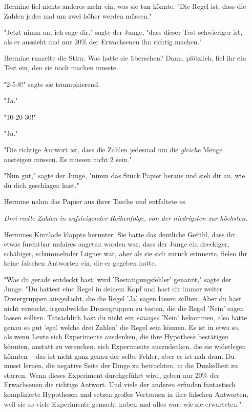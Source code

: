 {Hermine fiel nichts anderes mehr ein, was sie tun könnte. "Die Regel ist, dass die Zahlen jedes mal um zwei höher werden müssen."

"Jetzt nimm an, ich sage dir," sagte der Junge, "dass dieser Test schwieriger ist, als er aussieht und nur 20\% der Erwachsenen ihn richtig machen."

Hermine runzelte die Stirn. Was hatte sie übersehen? Dann, plötzlich, fiel ihr ein Test ein, den sie noch machen musste.

"2-5-8!" sagte sie triumphierend.

"Ja."

"10-20-30!"

"Ja."

"Die richtige Antwort ist, dass die Zahlen jedesmal um die \emph{gleiche} Menge ansteigen müssen. Es müssen nicht 2 sein."

"Nun gut," sagte der Junge, "nimm das Stück Papier heraus und sieh dir an, wie du dich geschlagen hast."

Hermine nahm das Papier aus ihrer Tasche und entfaltete es.

\emph{Drei reelle Zahlen in aufsteigender Reihenfolge, von der niedrigsten zur höchsten.}

Hermines Kinnlade klappte herunter. Sie hatte das deutliche Gefühl, dass ihr etwas furchtbar unfaires angetan worden war, dass der Junge ein dreckiger, schäbiger, schummelnder Lügner war, aber als sie sich zurück erinnerte, fielen ihr keine falschen Antworten ein, die er gegeben hatte.

"Was du gerade entdeckt hast, wird 'Bestätigungsfehler' genannt," sagte der Junge. "Du hattest eine Regel in deinem Kopf und hast dir immer weiter Dreiergruppen ausgedacht, die die Regel 'Ja' sagen lassen sollten. Aber du hast nicht versucht, irgendwelche Dreiergruppen zu testen, die die Regel 'Nein' sagen lassen sollten. Tatsächlich hast du nicht ein \emph{einziges} 'Nein' bekommen, also hätte genau so gut 'egal welche drei Zahlen' die Regel sein können. Es ist in etwa so, als wenn Leute sich Experimente ausdenken, die ihre Hypothese bestätigen könnten, anstatt zu versuchen, sich Experimente auszudenken, die sie widerlegen könnten -- das ist nicht ganz genau der selbe Fehler, aber es ist nah dran. Du musst lernen, die negative Seite der Dinge zu betrachten, in die Dunkelheit zu starren. Wenn dieses Experiment durchgeführt wird, geben nur 20\% der Erwachsenen die richtige Antwort. Und viele der anderen erfinden fantastisch komplizierte Hypothesen und setzen großes Vertrauen in ihre falschen Antworten, weil sie so viele Experimente gemacht haben und alles war, wie sie erwarteten."

}
